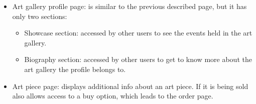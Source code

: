 \begin{itemize}
    \item Art gallery profile page: is similar to the previous described page, but it has only two sections:
    \begin{itemize}
        \item Showcase section: accessed by other users to see the events held in the art gallery.
        \item Biography section: accessed by other users to get to know more about the art gallery the profile belongs 
        to.
    \end{itemize}
    \item Art piece page: displays additional info about an art piece. If it is being sold also allows access to a buy 
    option, which leads to the order page.
\end{itemize}